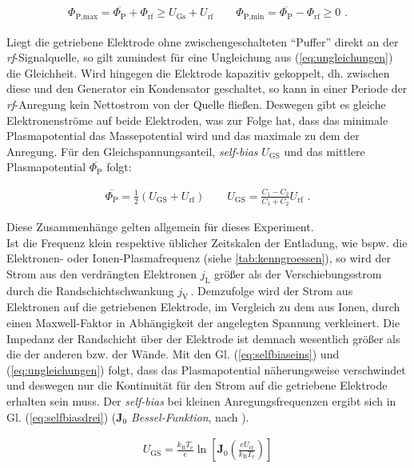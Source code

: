 \documentclass[numbers=noenddot,a4paper]{scrartcl}
\newcommand{\ix}[1]{_\text{#1}}
\newcommand{\tilt}[1]{\textit{#1}}
\begin{document}
						\begin{align}
							\Phi\ix{P,max}=\overline{\Phi\ix{P}}+\Phi\ix{rf}\geq U\ix{Gs}+U\ix{rf} \quad \quad \Phi\ix{P,min}=\overline{\Phi\ix{P}}-\Phi\ix{rf}\geq 0\, \, . \label{eq:ungleichungen}
						\end{align}

					Liegt die getriebene Elektrode ohne zwischengeschalteten ``Puffer'' direkt an der \tilt{rf}-Signalquelle, so gilt zumindest f\"ur eine Ungleichung aus (\ref{eq:ungleichungen}) die Gleichheit. Wird hingegen die Elektrode kapazitiv gekoppelt, dh. zwischen diese und den Generator ein Kondensator geschaltet, so kann in einer Periode der \tilt{rf}-Anregung kein Nettostrom von der Quelle flie{\ss}en. Deswegen gibt es gleiche Elektronenstr\"ome auf beide Elektroden, was zur Folge hat, dass das minimale Plasmapotential das Massepotential wird und das maximale zu dem der Anregung. F\"ur den Gleichspannungsanteil, \tilt{self-bias} $U\ix{GS}$ und das mittlere Plasmapotential $\overline{\Phi\ix{P}}$ folgt:

						\begin{align}
							\overline{\Phi\ix{P}}=\frac{1}{2}\left(U\ix{GS}+U\ix{rf}\right) \quad \quad U\ix{GS}=\frac{C\ix{1}-C\ix{2}}{C\ix{1}+C\ix{2}}U\ix{rf} \,\, .\label{eq:selfbiaszwei} 
						\end{align}

					Diese Zusammenh\"ange gelten allgemein f\"ur dieses Experiment.\\
					Ist die Frequenz klein respektive \"ublicher Zeitskalen der Entladung, wie bspw. die Elektronen- oder Ionen-Plasmafrequenz (siehe \ref{tab:kenngroessen}), so wird der Strom aus den verdr\"angten Elektronen $j\ix{L}$ gr\"o{\ss}er als der Verschiebungsstrom durch die Randschichtschwankung $j\ix{V}\,$. Demzufolge wird der Strom aus Elektronen auf die getriebenen Elektrode, im Vergleich zu dem aus Ionen, durch einen Maxwell-Faktor in Abhängigkeit der angelegten Spannung verkleinert. Die Impedanz der Randschicht über der Elektrode ist demnach wesentlich größer als die der anderen bzw. der Wände. Mit den Gl. (\ref{eq:selfbiaseins}) und (\ref{eq:ungleichungen}) folgt, dass das Plasmapotential näherungsweise verschwindet und deswegen nur die Kontinuität für den Strom auf die getriebene Elektrode erhalten sein muss. Der \tilt{self-bias} bei kleinen Anregungsfrequenzen ergibt sich in Gl. (\ref{eq:selfbiasdrei}) ($\mathbf{J}\ix{0}$ \tilt{Bessel-Funktion}, nach \cite{Piel10}). 

						\begin{align}
							U\ix{GS}=\frac{k\ix{B}T\ix{e}}{e}\ln\left[\mathbf{J}\ix{0}\left(\frac{eU\ix{rf}}{k\ix{B}T\ix{e}}\right)\right] \label{eq:selfbiasdrei}
						\end{align}
\end{document}
